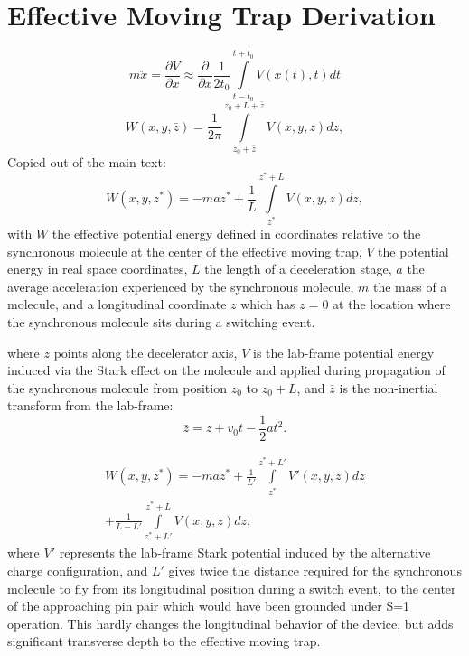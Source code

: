 \documentclass[%
 reprint,
 amsmath,amssymb,
 aps,
prl,
]{revtex4-1}
\begin{document}






\appendix

\section{Effective Moving Trap Derivation\label{app:effpot}}
\begin{equation}
m\ddot{x}=\frac{\partial V}{\partial x}\approx \frac{\partial}{\partial x}\frac{1}{2t_0}\int\limits_{t-t_0}^{t+t_0}V(x(t),t)dt
\end{equation}
\begin{equation}
W(x,y,\bar{z}) = \frac{1}{2\pi}\int\limits_{z_0+\bar{z}}^{z_0+L+\bar{z}}V(x,y,z)dz, 
\end{equation}
Copied out of the main text:
\begin{equation}
W(x,y,z^*) = - maz^* + \frac{1}{L}\int\limits_{z^*}^{z^*+L}V(x,y,z) dz,
\end{equation}
with $W$ the effective potential energy defined in coordinates relative to the synchronous molecule at the center of the effective moving trap, $V$ the potential energy in real space coordinates, $L$ the length of a deceleration stage, $a$ the average acceleration experienced by the synchronous molecule, $m$ the mass of a molecule, and a longitudinal coordinate $z$ which has $z=0$ at the location where the synchronous molecule sits during a switching event.

where $z$ points along the decelerator axis, $V$ is the lab-frame potential energy induced via the Stark effect on the molecule and applied during propagation of the synchronous molecule from position $z_0$ to $z_0+L$, and $\bar{z}$ is the non-inertial transform from the lab-frame: 
\begin{equation}
\bar{z} = z + v_0 t - \frac{1}{2}a t^2.
\end{equation}

\begin{multline}
W(x,y,z^*) = - maz^* + 
\frac{1}{L'}\!\!\int\limits_{z^*}^{z^*+L'}\!\!V'(x,y,z) dz \\
+\frac{1}{L-L'}\!\!\int\limits_{z^*+L'}^{z^*+L}\!\!V(x,y,z) dz,\hspace{2cm}
\end{multline}
where $V'$ represents the lab-frame Stark potential induced by the alternative charge configuration, and $L'$ gives twice the distance required for the synchronous molecule to fly from its longitudinal position during a switch event, to the center of the approaching pin pair which would have been grounded under S=1 operation. This hardly changes the longitudinal behavior of the device, but adds significant transverse depth to the effective moving trap.
\end{document}
